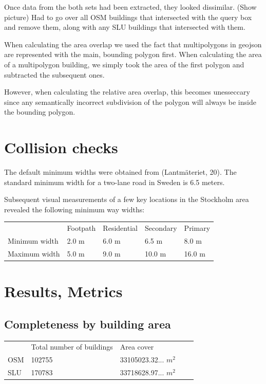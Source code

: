 \documentclass[a4paper]{article}
\begin{document}
Once data from the both sets had been extracted, they looked dissimilar. (Show picture) Had to go over all OSM buildings that intersected with the query box and remove them, along with any SLU buildings that intersected with them.

When calculating the area overlap we used the fact that multipolygons in geojson are represented with the main, bounding polygon first. When calculating the area of a multipolygon building, we simply took the area of the first polygon and subtracted the subsequent ones.

However, when calculating the relative area overlap, this becomes unesseccary since any semantically incorrect subdivision of the polygon will always be inside the bounding polygon.

\section{Collision checks}

The default minimum widths were obtained from (Lantmäteriet, 20). The standard minimum width for a two-lane road in Sweden is 6.5 meters.

Subsequent visual measurements of a few key locations in the Stockholm area revealed the following minimum way widths:
\begin{table}[H]
\begin{tabular}{lllll}
                  & Footpath & Residential & Secondary & Primary \\
    Minimum width & 2.0 m    & 6.0 m       & 6.5 m     & 8.0 m   \\
    Maximum width & 5.0 m    & 9.0 m       & 10.0 m    & 16.0 m
\end{tabular}
\end{table}

\section{Results, Metrics}

\subsection{Completeness by building area}

\begin{table}[H]
\begin{tabular}{lllll}
    & Total number of buildings & Area cover \\
    OSM & 102755 & 33105023.32... $m^2$ \\
    SLU & 170783 & 33718628.97... $m^2$
\end{tabular}
\end{table}
\end{document}

